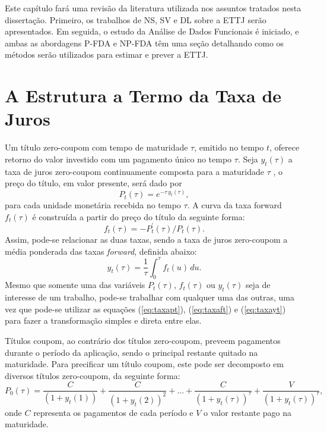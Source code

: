 \documentclass[
	12pt,				%
	openright,			%
	oneside,			%
	a4paper,			%
	english,			%
	brazil				%
	]{dissertacao-ufrgs-abntex2}
\begin{document}
Este capítulo fará uma revisão da literatura utilizada nos assuntos tratados nesta dissertação. Primeiro, os trabalhos de NS, SV e DL sobre a ETTJ serão apresentados. Em seguida, o estudo da Análise de Dados Funcionais é iniciado, e ambas as abordagens P-FDA e NP-FDA têm uma seção detalhando como os métodos serão utilizados para estimar e prever a ETTJ. 

\section{A Estrutura a Termo da Taxa de Juros}

Um título zero-coupom com tempo de maturidade $\tau$, emitido no tempo $t$, oferece retorno do valor investido com um pagamento único no tempo $\tau$. Seja $y_{t}(\tau)$ a taxa de juros zero-coupom continuamente composta para a maturidade $\tau$ , o preço do título, em valor presente, será dado por
\begin{equation}
P_{t}(\tau)=e^{-\tau\, y_{t}(\tau)},\label{eq:taxapt}
\end{equation}
para cada unidade monetária recebida no tempo $\tau$. A curva da
taxa forward $f_{t}(\tau)$ é construída a partir do preço do título
da seguinte forma:
\begin{equation}
f_{t}(\tau)=-P_{t}^{\prime}(\tau)/P_{t}(\tau).\label{eq:taxaft}
\end{equation}
Assim, pode-se relacionar as duas taxas, sendo a taxa de juros zero-coupom
a média ponderada das taxas \emph{forward}, definida abaixo:
\begin{equation}
y_{t}(\tau)=\frac{1}{\tau}\int_{0}^{\tau}f_{t}(u)\, du.\label{eq:taxayt}
\end{equation}
Mesmo que somente uma das variáveis $P_{t}(\tau)$,\foreignlanguage{english}{ $f_{t}(\tau)$} ou $y_{t}(\tau)$ seja de interesse de um trabalho, pode-se trabalhar com qualquer uma das outras, uma vez que pode-se utilizar as equações (\ref{eq:taxapt}), (\ref{eq:taxaft}) e (\ref{eq:taxayt}) para fazer a transformação simples e direta entre elas. 

Títulos coupom, ao contrário dos títulos zero-coupom, preveem pagamentos durante o período da aplicação, sendo o principal restante quitado na maturidade. Para precificar um título coupom, este pode ser decomposto em diversos títulos zero-coupom, da seguinte forma:
\[
P_{0}(\tau)=\frac{C}{(1+y_{t}(1))}+\frac{C}{(1+y_{t}(2))^{2}}+...+\frac{C}{(1+y_{t}(\tau))^{\tau}}+\frac{V}{(1+y_{t}(\tau))^{\tau}},
\]
onde $C$ representa os pagamentos de cada período e $V$ o valor
restante pago na maturidade.
\end{document}
